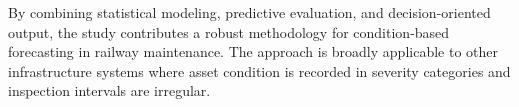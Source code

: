 By combining statistical modeling, predictive evaluation, and decision-oriented output, the study contributes a robust methodology for condition-based forecasting in railway maintenance. The approach is broadly applicable to other infrastructure systems where asset condition is recorded in severity categories and inspection intervals are irregular.






